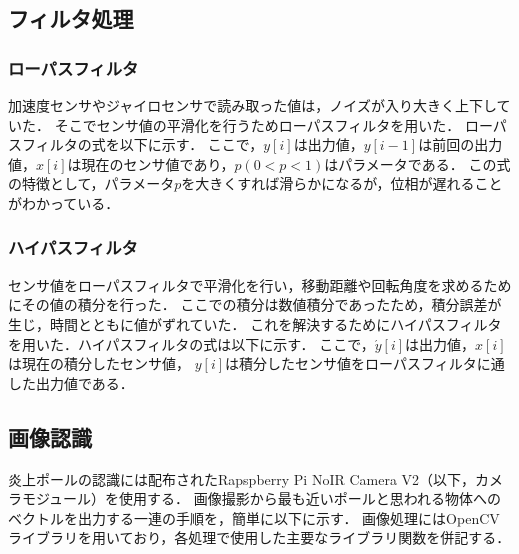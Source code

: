\documentclass[11pt,a4]{jsarticle}
\begin{document}
  \subsection{フィルタ処理}
    \subsubsection{ローパスフィルタ}
      加速度センサやジャイロセンサで読み取った値は，ノイズが入り大きく上下していた．
      そこでセンサ値の平滑化を行うためローパスフィルタを用いた．
      ローパスフィルタの式を以下に示す．
      ここで，$y[i]$は出力値，$y[i-1]$は前回の出力値，$x[i]$は現在のセンサ値であり，$p(0<p<1)$はパラメータである．
      この式の特徴として，パラメータ$p$を大きくすれば滑らかになるが，位相が遅れることがわかっている．

    \subsubsection{ハイパスフィルタ}
      センサ値をローパスフィルタで平滑化を行い，移動距離や回転角度を求めるためにその値の積分を行った．
      ここでの積分は数値積分であったため，積分誤差が生じ，時間とともに値がずれていた．
      これを解決するためにハイパスフィルタを用いた．ハイパスフィルタの式は以下に示す．
      ここで，$\acute{y}[i]$は出力値，$x[i]$は現在の積分したセンサ値，
      $y[i]$は積分したセンサ値をローパスフィルタに通した出力値である．

\subsection{画像認識}
  炎上ポールの認識には配布されたRapspberry Pi NoIR Camera V2（以下，カメラモジュール）を使用する．
  画像撮影から最も近いポールと思われる物体へのベクトルを出力する一連の手順を，簡単に以下に示す．
  画像処理にはOpenCVライブラリを用いており，各処理で使用した主要なライブラリ関数を併記する．
\end{document}
